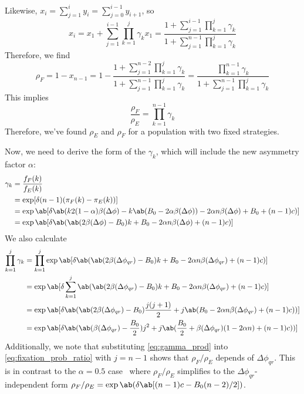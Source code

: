 \documentclass[pdflatex,sn-nature,super]{sn-jnl}
\begin{document}
Likewise, $x_i = \sum_{j=1}^i y_i = \sum_{j=0}^{i-1} y_{i+1}$, so
\begin{equation*}
  x_i
  = x_1 + \sum_{j=1}^{i-1} \prod_{k=1}^j \gamma_k x_1
  = \frac{1 + \sum_{j=1}^{i-1} \prod_{k=1}^j \gamma_k}
    {1 + \sum_{j=1}^{n-1} \prod_{k=1}^j \gamma_k}
\end{equation*}
Therefore, we find
\begin{equation*}
  \rho_F = 1 - x_{n-1}
  = 1 - \frac{1 + \sum_{j=1}^{n-2} \prod_{k=1}^j \gamma_k}
    {1 + \sum_{j=1}^{n-1} \prod_{k=1}^j \gamma_k}
  = \frac{\prod_{k=1}^{n-1} \gamma_k}{1 + \sum_{j=1}^{n-1} \prod_{k=1}^j \gamma_k}
\end{equation*}
This implies
\begin{equation}
  \frac{\rho_F}{\rho_E} = \prod_{k=1}^{n-1} \gamma_k
  \label{eq:fixation_prob_ratio}
\end{equation}
Therefore, we've found $\rho_E$ and $\rho_F$ for a population
with two fixed strategies.

Now, we need to derive the form of the $\gamma_k$,
which will include the new asymmetry factor $\alpha$:
\begin{align*}
  \gamma_k &= \frac{f_F(k)}{f_E(k)} \\
           &= \exp[\delta (n-1) (\pi_F(k) - \pi_E(k))]
           \\
           &= \exp\ab[\delta \ab(
    k 2 (1-\alpha) \beta(\Delta\phi)
    - k \ab(B_0 - 2 \alpha \beta(\Delta\phi))
                 - 2 \alpha n \beta(\Delta\phi) + B_0 + (n-1) c)] \\
      &= \exp\ab[\delta \ab(
    \ab(2 \beta(\Delta\phi) - B_0) k
                 + B_0 - 2 \alpha n \beta(\Delta\phi) + (n-1) c)]
\end{align*}
We also calculate
\begin{equation}
  \begin{aligned}
    \prod_{k=1}^j  \gamma_k
      &= \prod_{k=1}^j \exp\ab[\delta \ab(
      \ab(2 \beta(\Delta\phi_{qr}) - B_0) k
      + B_0 - 2 \alpha n \beta(\Delta\phi_{qr}) + (n-1) c)]
      \\
      &= \exp\ab[\delta \sum_{k=1}^j \ab(
      \ab(2 \beta(\Delta\phi_{qr}) - B_0) k
      + B_0 - 2 \alpha n \beta(\Delta\phi_{qr}) + (n-1) c)]
      \\
      &= \exp\ab[\delta \ab(
      \ab(2 \beta(\Delta\phi_{qr}) - B_0) \frac{j(j+1)}{2}
      + j \ab(B_0 - 2 \alpha n \beta(\Delta\phi_{qr}) + (n-1) c))]
      \\
      &= \exp\ab[\delta \ab(
      \ab(\beta(\Delta\phi_{qr}) - \frac{B_0}{2}) j^2
      + j \ab(\frac{B_0}{2} + \beta(\Delta\phi_{qr}) (1 - 2 \alpha n)  + (n-1) c))]
  \end{aligned}
  \label{eq:gamma_prod}
\end{equation}
Additionally, we note that substituting
\cref{eq:gamma_prod} into \cref{eq:fixation_prob_ratio}
with $j=n-1$ shows that $\rho_F/\rho_E$
depends of $\Delta \phi_{qr}$.
This is in contrast to the $\alpha=0.5$ case~\citep{tripp2022evolutionary}
where $\rho_F/\rho_E$ simplifies to the $\Delta \phi_{qr}$-independent form
$\rho_F/\rho_E = \exp \ab(\delta \ab[(n-1)c - B_0 (n-2)/2])$.
\end{document}
